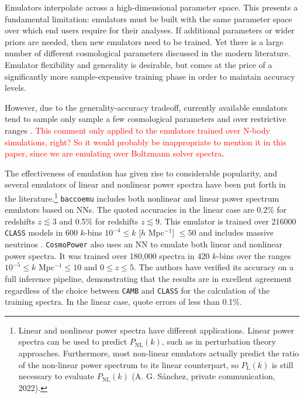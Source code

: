 Emulators interpolate across a high-dimensional parameter space. This presents
a fundamental limitation: emulators must be built with the same parameter
space over which end users require for their analyses. If additional
parameters or wider priors are needed, then new emulators need to be trained.
Yet there is a large number of different cosmological parameters discussed in 
the modern literature. Emulator flexibility and generality is desirable, but 
comes at the price of a significantly more sample-expensive training phase in
order to maintain accuracy levels.

However, due to the
generality-accuracy tradeoff, currently available emulators tend to sample
only sample a few cosmological parameters and over restrictive ranges
. \textcolor{red}{This comment only applied to the emulators
trained over N-body simulations, right? So it would probably be inappropriate
to mention it in this paper, since we are emulating over Boltzmann solver
spectra}.
\begin{comment}
	``Due to the high computational cost of the required
	simulations, [...] current emulators leave out parameters such as the
	curvature of the Universe or dynamic energy models beyond the standard CPL
	parametrization'' (\cbib{San21}).
\end{comment}

The effectiveness of emulation has given rise to considerable popularity, and
several emulators of linear and nonlinear power spectra have been put 
forth in the literature.\footnote{Linear and nonlinear power spectra have 
different
applications. Linear power spectra can be used to predict $P_\text{NL}(k)$, 
such as in perturbation theory approaches. Furthermore, most non-linear 
emulators actually predict the ratio of the non-linear power spectrum to its 
linear counterpart, so $P_\text{L}(k)$ is still necessary to evaluate
$P_\text{NL}(k)$ (A. G. S\'{a}nchez, private communication, 2022).}
\verb|baccoemu| includes both nonlinear and linear power spectrum emulators 
based on NNs. The quoted accuracies in the linear case are
0.2\% for redshifts $z \lesssim 3$ and
0.5\% for redshifts $z \lesssim 9$. This emulator is trained over 216000
\verb|CLASS|
models in 600 $k$-bins $10^{-4} \leq k$ [$h$ Mpc$^{-1}$] $\leq 50$ and 
includes massive neutrinos . \verb|CosmoPower| also uses an NN
to emulate both linear and nonlinear power spectra. It was trained over
180,000 spectra in 420 $k$-bins over the ranges
$10^{-5} \leq k $ Mpc$^{-1} \leq 10$ and 
$0 \leq z \leq 5$. The authors have verified
its accuracy on a full inference pipeline, demonstrating that the results
are in excellent agreement regardless of the choice between \verb|CAMB| and
\verb|CLASS| for the calculation of the training spectra. In the linear case,
\citet{Mancini} quote errors of less than 0.1\%. 

